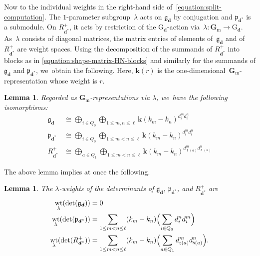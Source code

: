 \documentclass[JEP,XML,SOM,Unicode,NoEqCountersInSection,published]{cedram}
\theoremstyle{plain}
\newtheorem{lemma}[theorem]{Lemma}
\theoremstyle{definition}
\DeclareMathOperator\source{s}
\DeclareMathOperator\target{t}
\DeclareMathOperator\weight{wt}
\newcommand\dash{\nobreakdash-\hspace{0pt}}
\newcommand\field{\mathbf{k}}
\newcommand\Gm{\ensuremath{\mathbf{G}_{\mathrm{m}}}}
\newcommand\group[1][\tuple{d}]{\mathrm{G}_{#1}}
\newcommand\tuple[1]{\ensuremath{{\boldsymbol{#1}}}}
\begin{document}
Now to the individual weights in the right-hand side of~\eqref{equation:split-computation}.
The $1$-parameter subgroup~$\lambda$ acts on $\mathfrak{g}_{\tuple{d}}$ by conjugation
and $\mathfrak{p}_{\tuple{d}^*}$ is a submodule.
On $R_{\tuple{d}^*}^+$,
it acts by restriction of the $\group$-action via~$\lambda\colon \Gm \to \group$.
As~$\lambda$ consists of diagonal matrices,
the matrix entries of elements of~$\mathfrak{g}_{\tuple{d}}$
and of~$R_{\tuple{d}^*}^+$ are weight spaces.
Using the decomposition of the summands of $R_{\tuple{d}^*}^+$
into blocks as in \eqref{equation:shape-matrix-HN-blocks}
and similarly for the summands of $\mathfrak{g}_{\tuple{d}}$ and $\mathfrak{p}_{\tuple{d}^*}$, we~obtain the following.
Here, $\field(r)$ is the one-dimensional~$\Gm$\dash representation
whose weight is $r$.
\begin{lemma}
\label{lemma:weights-fibers}
Regarded as $\Gm$-representations via $\lambda$, we~have the following isomorphisms:
\begin{align*}
\mathfrak{g}_{\tuple{d}} &\cong \bigoplus_{i \in Q_0} \bigoplus_{1 \leq m,n \leq \ell} \field(k_m-k_n)^{d_i^md_i^n} \\
\mathfrak{p}_{\tuple{d}^*} &\cong \bigoplus_{i \in Q_0} \bigoplus_{1 \leq m<n \leq \ell} \field(k_m-k_n)^{d_i^md_i^n} \\
R_{\tuple{d}^*}^+ &\cong \bigoplus_{a \in Q_1} \bigoplus_{1 \leq m < n \leq \ell} \field(k_m-k_n)^{d_{\target(a)}^md_{\source(a)}^n}
\end{align*}
\end{lemma}
The above lemma implies at once the following.
\begin{lemma}
\label{lemma:weights-determinants}
The $\lambda$-weights of the determinants of $\mathfrak{g}_{\tuple{d}}$, $\mathfrak{p}_{\tuple{d}^*}$, and $R_{\tuple{d}^*}^+$ are
\begin{align*}
\weight_\lambda(\det(\mathfrak{g}_{\tuple{d}})) &= 0 \\
\weight_\lambda(\det(\mathfrak{p}_{\tuple{d}^*})) &= \sum_{1 \leq m < n \leq \ell} (k_m - k_n) \Bigl(\sum_{i \in Q_0} d_i^n d_i^m\Bigr) \\
\weight_\lambda(\det(R_{\tuple{d}^*}^+)) &= \sum_{1 \leq m < n \leq \ell} (k_m - k_n) \Bigl(\sum_{a\in Q_1} d_{\target(a)}^m d_{\source(a)}^n\Bigr).
\end{align*}
\end{lemma}
\end{document}
